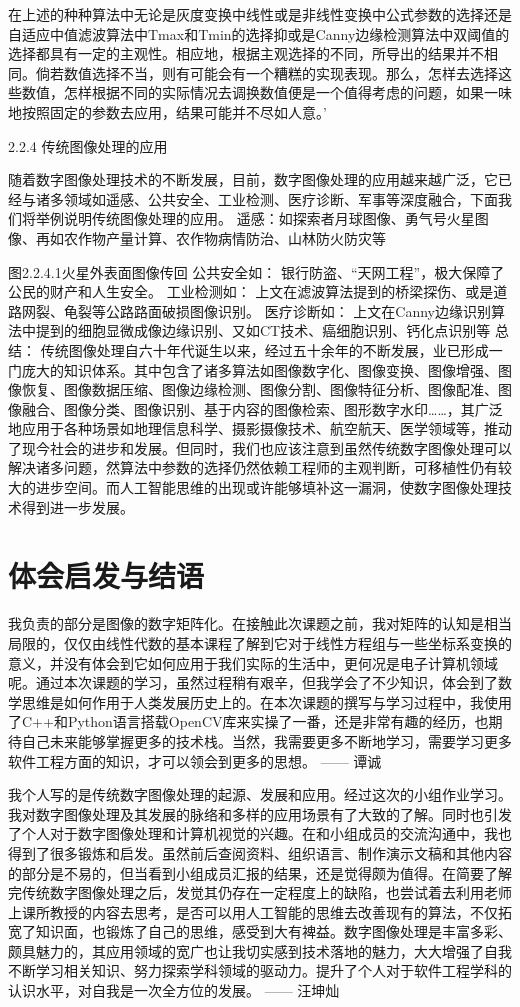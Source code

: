 	在上述的种种算法中无论是灰度变换中线性或是非线性变换中公式参数的选择还是自适应中值滤波算法中Tmax和Tmin的选择抑或是Canny边缘检测算法中双阈值的选择都具有一定的主观性。相应地，根据主观选择的不同，所导出的结果并不相同。倘若数值选择不当，则有可能会有一个糟糕的实现表现。那么，怎样去选择这些数值，怎样根据不同的实际情况去调换数值便是一个值得考虑的问题，如果一味地按照固定的参数去应用，结果可能并不尽如人意。'
	
2.2.4 传统图像处理的应用

	随着数字图像处理技术的不断发展，目前，数字图像处理的应用越来越广泛，它已经与诸多领域如遥感、公共安全、工业检测、医疗诊断、军事等深度融合，下面我们将举例说明传统图像处理的应用。
	遥感：如探索者月球图像、勇气号火星图像、再如农作物产量计算、农作物病情防治、山林防火防灾等

图2.2.4.1火星外表面图像传回
	公共安全如：
银行防盗、“天网工程”，极大保障了公民的财产和人生安全。
	工业检测如：
上文在滤波算法提到的桥梁探伤、或是道路网裂、龟裂等公路路面破损图像识别。	
	医疗诊断如：
上文在Canny边缘识别算法中提到的细胞显微成像边缘识别、又如CT技术、癌细胞识别、钙化点识别等
总结：
	传统图像处理自六十年代诞生以来，经过五十余年的不断发展，业已形成一门庞大的知识体系。其中包含了诸多算法如图像数字化、图像变换、图像增强、图像恢复、图像数据压缩、图像边缘检测、图像分割、图像特征分析、图像配准、图像融合、图像分类、图像识别、基于内容的图像检索、图形数字水印……，其广泛地应用于各种场景如地理信息科学、摄影摄像技术、航空航天、医学领域等，推动了现今社会的进步和发展。但同时，我们也应该注意到虽然传统数字图像处理可以解决诸多问题，然算法中参数的选择仍然依赖工程师的主观判断，可移植性仍有较大的进步空间。而人工智能思维的出现或许能够填补这一漏洞，使数字图像处理技术得到进一步发展。

\section{体会启发与结语}
	我负责的部分是图像的数字矩阵化。在接触此次课题之前，我对矩阵的认知是相当局限的，仅仅由线性代数的基本课程了解到它对于线性方程组与一些坐标系变换的意义，并没有体会到它如何应用于我们实际的生活中，更何况是电子计算机领域呢。通过本次课题的学习，虽然过程稍有艰辛，但我学会了不少知识，体会到了数学思维是如何作用于人类发展历史上的。在本次课题的撰写与学习过程中，我使用了C++和Python语言搭载OpenCV库来实操了一番，还是非常有趣的经历，也期待自己未来能够掌握更多的技术栈。当然，我需要更多不断地学习，需要学习更多软件工程方面的知识，才可以领会到更多的思想。
—— 谭诚

	我个人写的是传统数字图像处理的起源、发展和应用。经过这次的小组作业学习。我对数字图像处理及其发展的脉络和多样的应用场景有了大致的了解。同时也引发了个人对于数字图像处理和计算机视觉的兴趣。在和小组成员的交流沟通中，我也得到了很多锻炼和启发。虽然前后查阅资料、组织语言、制作演示文稿和其他内容的部分是不易的，但当看到小组成员汇报的结果，还是觉得颇为值得。在简要了解完传统数字图像处理之后，发觉其仍存在一定程度上的缺陷，也尝试着去利用老师上课所教授的内容去思考，是否可以用人工智能的思维去改善现有的算法，不仅拓宽了知识面，也锻炼了自己的思维，感受到大有裨益。数字图像处理是丰富多彩、颇具魅力的，其应用领域的宽广也让我切实感到技术落地的魅力，大大增强了自我不断学习相关知识、努力探索学科领域的驱动力。提升了个人对于软件工程学科的认识水平，对自我是一次全方位的发展。
—— 汪坤灿

